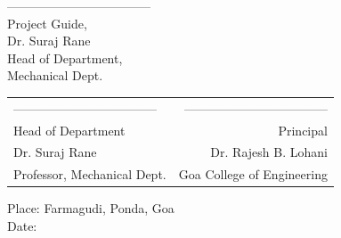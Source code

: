 \noindent -----------------------------------\\
Project Guide,\\
Dr. Suraj Rane\\
Head of Department,\\
Mechanical Dept.\\



\begin{table}[H]
\begin{tabular}{lr}
\noindent ----------------------------------- & \hspace{6cm} ----------------------------------- \\
Head of Department & Principal\\
Dr. Suraj Rane & Dr. Rajesh B. Lohani\\
Professor, Mechanical Dept. & Goa College of Engineering\\
\end{tabular}
\end{table}
\vspace{-0.5cm}
\noindent Place: Farmagudi, Ponda, Goa\\
\noindent Date: